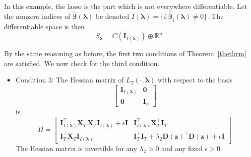 \documentclass[10pt,letterpaper]{article}
\begin{document}
In this example, the lasso is the part which is not everywhere differentiable. Let the nonzero indices of $\hat{\boldsymbol{\beta}}(\boldsymbol\lambda)$ be denoted $I(\boldsymbol\lambda) = \{i | \hat{\boldsymbol{\beta}}_i(\boldsymbol\lambda) \ne 0\}$. The differentiable space is then
\begin{equation}
S_{\boldsymbol{\lambda}} = C(\boldsymbol I_{I(\boldsymbol\lambda)}) \oplus \mathbb{R}^n
\end{equation}

By the same reasoning as before, the first two conditions of Theorem~\ref{thethrm} are satisfied. We now check for the third condition.
\begin{itemize}
\item[] Condition 3: The Hessian matrix of $L_T(\cdot, \boldsymbol{\lambda})$ with respect to the basis 
\begin{equation}
\begin{bmatrix}
\boldsymbol I_{I(\boldsymbol\lambda)} & \boldsymbol 0\\
\boldsymbol 0 & \boldsymbol I_n
\end{bmatrix}
\label{eq:aplmbasis}
\end{equation}
is
\begin{equation}
H =
\begin{bmatrix}
\boldsymbol I_{I(\boldsymbol \lambda)}^\top \boldsymbol X_T^\top \boldsymbol X_T \boldsymbol I_{I(\boldsymbol \lambda)} + \epsilon \boldsymbol I
&  \boldsymbol I_{I(\boldsymbol \lambda)}^\top \boldsymbol X_T^\top \boldsymbol I_T \\
\boldsymbol I_T^\top \boldsymbol X_T \boldsymbol I_{I(\boldsymbol \lambda)} &
\boldsymbol I_T^\top \boldsymbol{I}_T + \lambda_2 \boldsymbol{D}(\boldsymbol{z})^\top \boldsymbol{D}(\boldsymbol{z}) + \epsilon \boldsymbol I
\end{bmatrix}
\end{equation}
The Hessian matrix is invertible for any $\lambda_2 > 0$ and any fixed $\epsilon > 0$.
\end{itemize}
\end{document}
